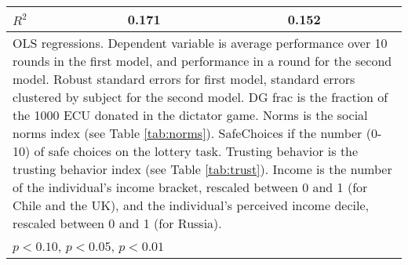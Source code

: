 {\begin{tabular}{l*{2}{cc}}
\(R^{2}\)       &    0.171         &         &    0.152         &         \\
\hline\hline
\multicolumn{5}{l}{\footnotesize OLS regressions. Dependent variable is average performance over 10 rounds in the first model, and performance in a round for the second model. Robust standard errors for first model, standard errors clustered by subject for the second model. DG frac is the fraction of the 1000 ECU donated in the dictator game. Norms is the social norms index (see Table \ref{tab:norms}). SafeChoices if the number (0-10) of safe choices on the lottery task. Trusting behavior is the trusting behavior index (see Table \ref{tab:trust}). Income is the number of the individual's income bracket, rescaled between 0 and 1 (for Chile and the UK), and the individual's perceived income decile, rescaled between 0 and 1 (for Russia).}\\
\multicolumn{5}{l}{\footnotesize \sym{*} \(p<0.10\), \sym{**} \(p<0.05\), \sym{***} \(p<0.01\)}\\
\end{tabular}
}
